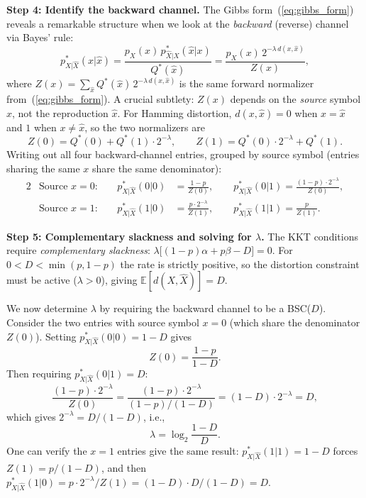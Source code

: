 \documentclass[11pt]{article}
\newcommand{\E}{\mathbb{E}}
\begin{document}
\smallskip
\noindent\textbf{Step 4: Identify the backward channel.}
The Gibbs form~(\ref{eq:gibbs_form}) reveals a remarkable structure when we
look at the \emph{backward} (reverse) channel via Bayes' rule:
\[
p^*_{X|\hat{X}}(x|\hat{x})
= \frac{p_X(x)\,p^*_{\hat{X}|X}(\hat{x}|x)}{Q^*(\hat{x})}
= \frac{p_X(x)\, 2^{-\lambda\, d(x,\hat{x})}}{Z(x)},
\]
where $Z(x) = \sum_{\hat{x}} Q^*(\hat{x})\,2^{-\lambda\,d(x,\hat{x})}$ is
the same forward normalizer from~(\ref{eq:gibbs_form}).
A crucial subtlety: $Z(x)$ depends on the \emph{source} symbol $x$, not the
reproduction $\hat{x}$.
For Hamming distortion, $d(x,\hat{x}) = 0$ when $x = \hat{x}$ and $1$ when
$x \neq \hat{x}$, so the two normalizers are
\[
Z(0) = Q^*(0) + Q^*(1)\cdot 2^{-\lambda},\qquad
Z(1) = Q^*(0)\cdot 2^{-\lambda} + Q^*(1).
\]
Writing out all four backward-channel entries, grouped by source symbol
(entries sharing the same $x$ share the same denominator):
\begin{alignat*}{2}
&\text{Source }x=0:\quad
& p^*_{X|\hat{X}}(0|0) &= \frac{1-p}{Z(0)},\qquad
  p^*_{X|\hat{X}}(0|1) = \frac{(1-p)\cdot 2^{-\lambda}}{Z(0)},\\[4pt]
&\text{Source }x=1:\quad
& p^*_{X|\hat{X}}(1|0) &= \frac{p\cdot 2^{-\lambda}}{Z(1)},\qquad
  p^*_{X|\hat{X}}(1|1) = \frac{p}{Z(1)}.
\end{alignat*}

\smallskip
\noindent\textbf{Step 5: Complementary slackness and solving for $\lambda$.}
The KKT conditions require \emph{complementary slackness}:
$\lambda\bigl[(1-p)\alpha + p\beta - D\bigr] = 0$.
For $0 < D < \min(p, 1-p)$ the rate is strictly positive, so the distortion
constraint must be active ($\lambda > 0$), giving
$\E[d(X,\hat{X})] = D$.

We now determine $\lambda$ by requiring the backward channel to be a BSC($D$).
Consider the two entries with source symbol $x = 0$ (which share the
denominator $Z(0)$).
Setting $p^*_{X|\hat{X}}(0|0) = 1-D$ gives
\[
Z(0) = \frac{1-p}{1-D}.
\]
Then requiring $p^*_{X|\hat{X}}(0|1) = D$:
\[
\frac{(1-p)\cdot 2^{-\lambda}}{Z(0)}
= \frac{(1-p)\cdot 2^{-\lambda}}{(1-p)/(1-D)}
= (1-D)\cdot 2^{-\lambda} = D,
\]
which gives $2^{-\lambda} = D/(1-D)$, i.e.,
\begin{equation}
\label{eq:lambda_kkt}
\lambda = \log_2\frac{1-D}{D}.
\end{equation}
One can verify the $x = 1$ entries give the same result:
$p^*_{X|\hat{X}}(1|1) = 1-D$ forces $Z(1) = p/(1-D)$, and then
$p^*_{X|\hat{X}}(1|0) = p\cdot 2^{-\lambda}/Z(1) = (1-D)\cdot D/(1-D) = D$.\;\checkmark
\end{document}
